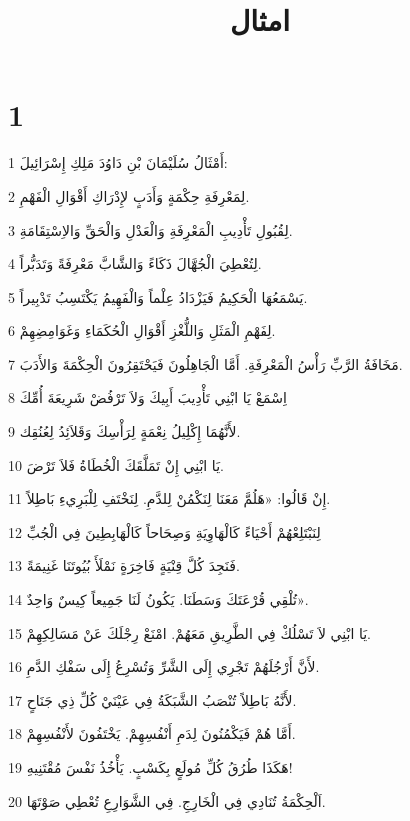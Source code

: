 

\title{امثال}


\chapter{1}

\par 1 أَمْثَالُ سُلَيْمَانَ بْنِ دَاوُدَ مَلِكِ إِسْرَائِيلَ:
\par 2 لِمَعْرِفَةِ حِكْمَةٍ وَأَدَبٍ لإِدْرَاكِ أَقْوَالِ الْفَهْمِ.
\par 3 لِقُبُولِ تَأْدِيبِ الْمَعْرِفَةِ وَالْعَدْلِ وَالْحَقِّ وَالاِسْتِقَامَةِ.
\par 4 لِتُعْطِيَ الْجُهَّالَ ذَكَاءً وَالشَّابَّ مَعْرِفَةً وَتَدَبُّراً.
\par 5 يَسْمَعُهَا الْحَكِيمُ فَيَزْدَادُ عِلْماً وَالْفَهِيمُ يَكْتَسِبُ تَدْبِيراً.
\par 6 لِفَهْمِ الْمَثَلِ وَاللُّغْزِ أَقْوَالِ الْحُكَمَاءِ وَغَوَامِضِهِمْ.
\par 7 مَخَافَةُ الرَّبِّ رَأْسُ الْمَعْرِفَةِ. أَمَّا الْجَاهِلُونَ فَيَحْتَقِرُونَ الْحِكْمَةَ وَالأَدَبَ.
\par 8 اِسْمَعْ يَا ابْنِي تَأْدِيبَ أَبِيكَ وَلاَ تَرْفُضْ شَرِيعَةَ أُمِّكَ
\par 9 لأَنَّهُمَا إِكْلِيلُ نِعْمَةٍ لِرَأْسِكَ وَقَلاَئِدُ لِعُنُقِك.
\par 10 يَا ابْنِي إِنْ تَمَلَّقَكَ الْخُطَاةُ فَلاَ تَرْضَ.
\par 11 إِنْ قَالُوا: «هَلُمَّ مَعَنَا لِنَكْمُنْ لِلدَّمِ. لِنَخْتَفِ لِلْبَرِيءِ بَاطِلاً.
\par 12 لِنَبْتَلِعْهُمْ أَحْيَاءً كَالْهَاوِيَةِ وَصِحَاحاً كَالْهَابِطِينَ فِي الْجُبِّ
\par 13 فَنَجِدَ كُلَّ قِنْيَةٍ فَاخِرَةٍ نَمْلَأَ بُيُوتَنَا غَنِيمَةً.
\par 14 تُلْقِي قُرْعَتَكَ وَسَطَنَا. يَكُونُ لَنَا جَمِيعاً كِيسٌ وَاحِدٌ».
\par 15 يَا ابْنِي لاَ تَسْلُكْ فِي الطَّرِيقِ مَعَهُمْ. امْنَعْ رِجْلَكَ عَنْ مَسَالِكِهِمْ.
\par 16 لأَنَّ أَرْجُلَهُمْ تَجْرِي إِلَى الشَّرِّ وَتُسْرِعُ إِلَى سَفْكِ الدَّمِ.
\par 17 لأَنَّهُ بَاطِلاً تُنْصَبُ الشَّبَكَةُ فِي عَيْنَيْ كُلِّ ذِي جَنَاحٍ.
\par 18 أَمَّا هُمْ فَيَكْمُنُونَ لِدَمِ أَنْفُسِهِمْ. يَخْتَفُونَ لأَنْفُسِهِمْ.
\par 19 هَكَذَا طُرُقُ كُلِّ مُولَعٍ بِكَسْبٍ. يَأْخُذُ نَفْسَ مُقْتَنِيهِ!
\par 20 اَلْحِكْمَةُ تُنَادِي فِي الْخَارِجِ. فِي الشَّوَارِعِ تُعْطِي صَوْتَهَا.
